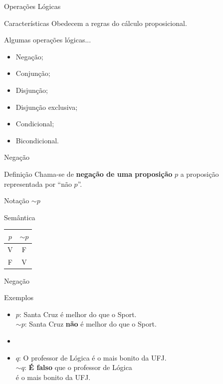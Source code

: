 \documentclass[xcolor=dvipsnames,table]{beamer}
\begin{document}
	\begin{frame}{Operações Lógicas}
		\begin{block}{Características}
			Obedecem a regras do cálculo proposicional.
		\end{block} \pause
		\begin{block}{Algumas operações lógicas...}
			\begin{itemize}[label=-]
				\item Negação;
				\item Conjunção;
				\item Disjunção;
				\item Disjunção exclusiva;
				\item Condicional;
				\item Bicondicional.
			\end{itemize}
		\end{block}
	\end{frame}

	\begin{frame}{Negação}
		\begin{block}{Definição}
			Chama-se de {\bf negação de uma proposição} $p$ a proposição representada por ``não $p$''.
		\end{block} \pause
		\begin{block}{Notação}
			$\sim p$
		\end{block} \pause
		\begin{block}{Semântica}
			\begin{center}
				\begin{tabular}{|c|c|}
					\hline
					$p$	&	$\sim p$	\\
					\hline
					V	&	F	\\
					F	&	V	\\
					\hline
				\end{tabular}
			\end{center}
		\end{block}
	\end{frame}

	\begin{frame}{Negação}
		\begin{block}{Exemplos}
			\begin{itemize}
				\item $p$: Santa Cruz é melhor do que o Sport.\\
				$\sim p$: Santa Cruz {\bf não} é melhor do que o Sport.
				\item \pause
				\item $q$: O professor de Lógica é o mais bonito da UFJ.\\
				$\sim q$: {\bf É falso} que o professor de Lógica \\\hspace*{0.9cm}é o mais bonito da UFJ.
			\end{itemize}
		\end{block}
\end{frame}
\end{document}
